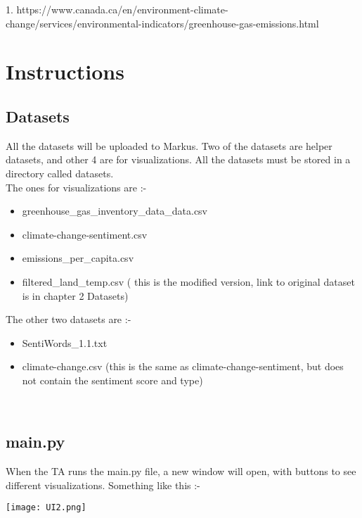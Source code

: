 \documentclass[a4paper, 11pt]{report}
\begin{document}
\scriptsize
1. https://www.canada.ca/en/environment-climate-change/services/environmental-indicators/greenhouse-gas-emissions.html

\chapter{Instructions}

\section{Datasets}
\normalsize
All the datasets will be uploaded to Markus. Two of the datasets are helper datasets, and other 4 are for visualizations. All the datasets must be stored in a directory called datasets.\\

The ones for visualizations are :-

\begin{itemize}
    \item greenhouse\_gas\_inventory\_data\_data.csv
    \item climate-change-sentiment.csv
    \item emissions\_per\_capita.csv
    \item filtered\_land\_temp.csv ( this is the modified version, link to original dataset is in chapter 2 Datasets)\\


\end{itemize}

The other two datasets are :-

\begin{itemize}
    \item SentiWords\_1.1.txt
    \item climate-change.csv (this is the same as climate-change-sentiment, but does not contain the sentiment score and type)
\end{itemize}

~
\newpage

\section{main.py}

When the TA runs the main.py file, a new window will open, with buttons to see different visualizations. Something like this :-

\texttt{[image: UI2.png]}

~\\
\end{document}
